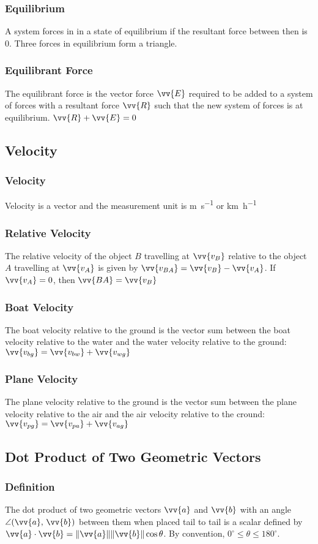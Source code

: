 \documentclass{article}
\newcommand{\mv}[1]{
	\lVert\vv{#1}\rVert
}
\begin{document}
	\subsubsection{Equilibrium}
	A system forces in in a state of equilibrium if the resultant force between then is 0. Three forces in equilibrium form a triangle.
	\subsubsection{Equilibrant Force}
	The equilibrant force is the vector force $\vv{E}$ required to be added to a system of forces with a resultant force $\vv{R}$ such that the new system of forces is at equilibrium. $\vv{R}+\vv{E}=0$
	\subsection{Velocity}
	\subsubsection{Velocity}
	Velocity is a vector and the measurement unit is \si{\meter\per\second} or \si{\kilo\meter\per\hour}
	\subsubsection{Relative Velocity}
	The relative velocity of the object $B$ travelling at $\vv{v_B}$ relative to the object $A$ travelling at $\vv{v_A}$ is given by $\vv{v_{BA}}=\vv{v_B}-\vv{v_A}$. If $\vv{v_A}=0$, then $\vv{BA}=\vv{v_B}$
	\subsubsection{Boat Velocity}
	The boat velocity relative to the ground is the vector sum between the boat velocity relative to the water and the water velocity relative to the ground: $\vv{v_{bg}}=\vv{v_{bw}}+\vv{v_{wg}}$
	\subsubsection{Plane Velocity}
	The plane velocity relative to the ground is the vector sum between the plane velocity relative to the air and the air velocity relative to the cround: $\vv{v_{pg}}=\vv{v_{pa}}+\vv{v_{ag}}$
	\subsection{Dot Product of Two Geometric Vectors}
	\subsubsection{Definition}
	The dot product of two geometric vectors $\vv{a}$ and $\vv{b}$ with an angle $\angle(\vv{a},\,\vv{b})$ between them when placed tail to tail is a scalar defined by $\vv{a}\cdot\vv{b}=\mv{a}\mv{b}\cos\theta$. By convention, $0^\circ\leq\theta\leq180^\circ$. %
\end{document}
